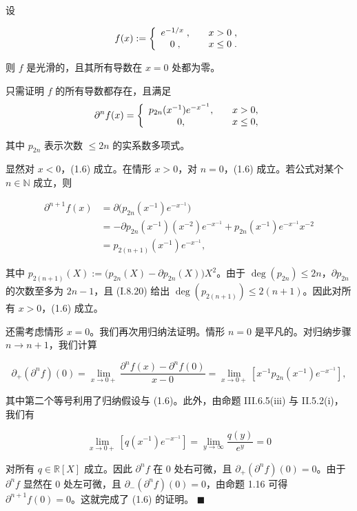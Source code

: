 \begin{example}

设

\begin{equation}
f(x):=\left\{\begin{array}{c l}{e^{-1/x}\;,}&{\quad x>0\;,}\\ {0\;,}&{\quad x\leq0\;.}\\ \end{array}\right.
\end{equation}

则 $f$ 是光滑的，且其所有导数在 $x = 0$ 处都为零。

\proofhead
只需证明 $f$ 的所有导数都存在，且满足
\begin{equation*}
\partial^{n}f(x)=\left\{\begin{array}{c l}{p_{2n}(x^{-1})e^{-x^{-1}},}&{\quad x>0,}\\ {0,}&{\quad x\leq0,}\\ \end{array}\right.
\end{equation*}

其中 $ p_{2n} $ 表示次数 $ \leq 2n $ 的实系数多项式。

显然对 $x < 0$，(1.6) 成立。在情形 $x > 0$，对 $n = 0$，(1.6) 成立。若公式对某个 $n \in \mathbb{N}$ 成立，则

\begin{equation*}
\begin{aligned}
\partial^{n+1}f(x)&=\partial\big(p_{2n}(x^{-1})e^{-x^{-1}}\big)\\&=-\partial p_{2n}(x^{-1})(x^{-2})e^{-x^{-1}}+p_{2n}(x^{-1})e^{-x^{-1}}x^{-2}\\&=p_{2(n+1)}(x^{-1})e^{-x^{-1}},
\end{aligned}
\end{equation*}

其中 $p_{2(n+1)}(X):=\big(p_{2n}(X)-\partial p_{2n}(X)\big)X^{2}$。由于 $\deg(p_{2n})\leq2n$，$\partial p_{2n}$ 的次数至多为 $2n-1$，且 (I.8.20) 给出 $\deg(p_{2(n+1)})\leq2(n+1)$。因此对所有 $x>0$，(1.6) 成立。

还需考虑情形 $x = 0$。我们再次用归纳法证明。情形 $ n = 0 $ 是平凡的。对归纳步骤 $ n \to n + 1 $，我们计算

\[
\partial_{+}(\partial^{n}f)(0)=\lim_{x\to0+}\frac{\partial^{n}f(x)-\partial^{n}f(0)}{x-0}=\lim_{x\to0+}\left[x^{-1}p_{2n}(x^{-1})e^{-x^{-1}}\right],
\]

其中第二个等号利用了归纳假设与 (1.6)。此外，由命题 III.6.5(iii) 与 II.5.2(i)，我们有

\begin{equation}
\lim_{x\to0+}\left[q(x^{-1})e^{-x^{-1}}\right]=\lim_{y\to\infty}\frac{q(y)}{e^{y}}=0
\end{equation}

对所有 $ q \in \mathbb{R}[X] $ 成立。因此 $ \partial^n f $ 在 0 处右可微，且 $ \partial_+(\partial^n f)(0) = 0 $。由于 $ \partial^n f $ 显然在 0 处左可微，且 $ \partial_-( \partial^n f)(0) = 0 $，由命题 1.16 可得 $ \partial^{n+1} f(0) = 0 $。这就完成了 (1.6) 的证明。 $ \blacksquare $

\end{example}

